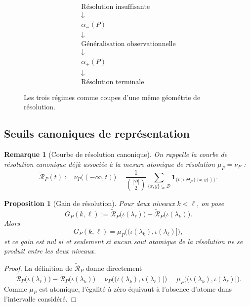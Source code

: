 \documentclass[11pt,a4paper]{article}
\newtheorem{proposition}{Proposition}
\newtheorem{remark}{Remarque}
\begin{document}
\begin{appendices}
\begin{figure}[t]
\centering
\[
\begin{array}{c}
\text{Résolution insuffisante}\\[0.3em]
\downarrow\\[0.3em]
\alpha_-(P)\\[0.3em]
\downarrow\\[0.3em]
\text{Généralisation observationnelle}\\[0.3em]
\downarrow\\[0.3em]
\alpha_+(P)\\[0.3em]
\downarrow\\[0.3em]
\text{Résolution terminale}
\end{array}
\]
\caption{Les trois régimes comme coupes d'une même géométrie de résolution.}
\end{figure}

\subsection{Seuils canoniques de représentation}

\begin{remark}[Courbe de résolution canonique]
On rappelle la courbe de résolution canonique déjà associée à la mesure atomique de résolution \(\mu_P=\nu_P\) :
\[
\widetilde{\mathcal R}_P(t)
:=
\nu_P\bigl((-\infty,t)\bigr)
=
\frac{1}{\binom{|\mathcal D|}{2}}
\sum_{\{x,y\}\subseteq\mathcal D}
\mathbf 1_{\{t>\Theta_P(\{x,y\})\}}.
\]
\end{remark}

\begin{proposition}[Gain de résolution]
Pour deux niveaux \(k<\ell\), on pose
\[
G_P(k,\ell):=
\widetilde{\mathcal R}_P\bigl(\iota(\lambda_\ell)\bigr)
-
\widetilde{\mathcal R}_P\bigl(\iota(\lambda_k)\bigr).
\]
Alors
\[
G_P(k,\ell)=\mu_P\bigl((\iota(\lambda_k),\iota(\lambda_\ell)]\bigr),
\]
et ce gain est nul si et seulement si aucun saut atomique de la résolution ne se produit entre les deux niveaux.
\end{proposition}

\begin{proof}
La définition de \(\widetilde{\mathcal R}_P\) donne directement
\[
\widetilde{\mathcal R}_P\bigl(\iota(\lambda_\ell)\bigr)-\widetilde{\mathcal R}_P\bigl(\iota(\lambda_k)\bigr)
=
\nu_P\bigl((\iota(\lambda_k),\iota(\lambda_\ell)]\bigr)
=
\mu_P\bigl((\iota(\lambda_k),\iota(\lambda_\ell)]\bigr).
\]
Comme \(\mu_P\) est atomique, l'égalité à zéro équivaut à l'absence d'atome dans l'intervalle considéré.
\end{proof}


\end{appendices}
\end{document}
